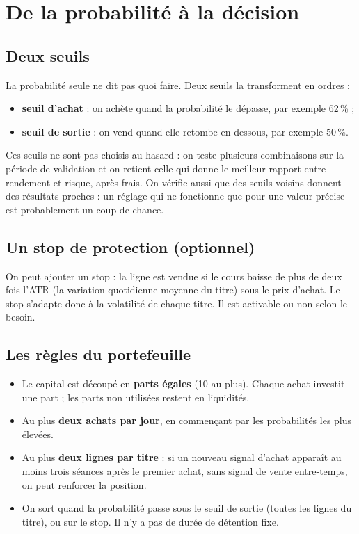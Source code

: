 \documentclass[11pt,a4paper]{article}
\begin{document}
\section{De la probabilité à la décision}
\subsection{Deux seuils}
La probabilité seule ne dit pas quoi faire. Deux seuils la transforment en ordres :
\begin{itemize}[nosep]
  \item \textbf{seuil d'achat} : on achète quand la probabilité le dépasse, par exemple 62\,\% ;
  \item \textbf{seuil de sortie} : on vend quand elle retombe en dessous, par exemple 50\,\%.
\end{itemize}
Ces seuils ne sont pas choisis au hasard : on teste plusieurs combinaisons sur la période
de validation et on retient celle qui donne le meilleur rapport entre rendement et risque,
après frais. On vérifie aussi que des seuils voisins donnent des résultats proches : un
réglage qui ne fonctionne que pour une valeur précise est probablement un coup de chance.

\subsection{Un stop de protection (optionnel)}
On peut ajouter un stop : la ligne est vendue si le cours baisse de plus de deux fois
l'ATR (la variation quotidienne moyenne du titre) sous le prix d'achat. Le stop s'adapte
donc à la volatilité de chaque titre. Il est activable ou non selon le besoin.

\subsection{Les règles du portefeuille}
\begin{itemize}[nosep]
  \item Le capital est découpé en \textbf{parts égales} (10 au plus). Chaque achat investit
  une part ; les parts non utilisées restent en liquidités.
  \item Au plus \textbf{deux achats par jour}, en commençant par les probabilités les plus élevées.
  \item Au plus \textbf{deux lignes par titre} : si un nouveau signal d'achat apparaît au
  moins trois séances après le premier achat, sans signal de vente entre-temps, on peut
  renforcer la position.
  \item On sort quand la probabilité passe sous le seuil de sortie (toutes les lignes du
  titre), ou sur le stop. Il n'y a pas de durée de détention fixe.
\end{itemize}
\end{document}
